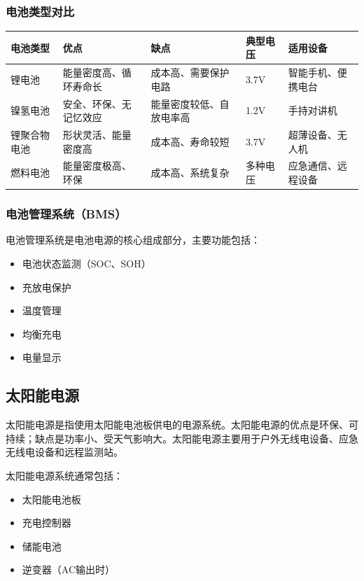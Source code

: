 \documentclass[12pt,UTF8]{ctexbook}
\begin{document}
\subsubsection{电池类型对比}

\begin{tabular}{|l|l|l|l|l|}
\hline
电池类型 & 优点 & 缺点 & 典型电压 & 适用设备 \\
\hline
锂电池 & 能量密度高、循环寿命长 & 成本高、需要保护电路 & 3.7V & 智能手机、便携电台 \\
\hline
镍氢电池 & 安全、环保、无记忆效应 & 能量密度较低、自放电率高 & 1.2V & 手持对讲机 \\
\hline
锂聚合物电池 & 形状灵活、能量密度高 & 成本高、寿命较短 & 3.7V & 超薄设备、无人机 \\
\hline
燃料电池 & 能量密度极高、环保 & 成本高、系统复杂 & 多种电压 & 应急通信、远程设备 \\
\hline
\end{tabular}

\subsubsection{电池管理系统（BMS）}

电池管理系统是电池电源的核心组成部分，主要功能包括：
\begin{itemize}
    \item 电池状态监测（SOC、SOH）
    \item 充放电保护
    \item 温度管理
    \item 均衡充电
    \item 电量显示
\end{itemize}

\subsection{太阳能电源}

太阳能电源是指使用太阳能电池板供电的电源系统。太阳能电源的优点是环保、可持续；缺点是功率小、受天气影响大。太阳能电源主要用于户外无线电设备、应急无线电设备和远程监测站。

太阳能电源系统通常包括：
\begin{itemize}
    \item 太阳能电池板
    \item 充电控制器
    \item 储能电池
    \item 逆变器（AC输出时）
\end{itemize}
\end{document}
